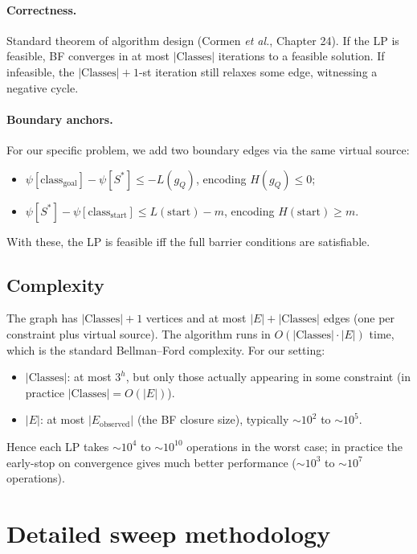 \documentclass[11pt,a4paper]{article}
\theoremstyle{plain}
\theoremstyle{definition}
\begin{document}
\paragraph{Correctness.}
Standard theorem of algorithm design (Cormen \emph{et al.}, Chapter
24). If the LP is feasible, BF converges in at most
$|\mathrm{Classes}|$ iterations to a feasible solution. If
infeasible, the
$|\mathrm{Classes}| + 1$-st iteration still relaxes some edge,
witnessing a negative cycle.

\paragraph{Boundary anchors.}
For our specific problem, we add two boundary edges via the same
virtual source:
\begin{itemize}
   \item $\psi[\text{class}_{\text{goal}}] - \psi[S^{*}] \le - L(g_Q)$,
         encoding $H(g_Q) \le 0$;
   \item $\psi[S^{*}] - \psi[\text{class}_{\text{start}}] \le L(\text{start}) - m$,
         encoding $H(\text{start}) \ge m$.
\end{itemize}
With these, the LP is feasible iff the full barrier conditions are
satisfiable.

\subsection*{Complexity}

The graph has $|\mathrm{Classes}| + 1$ vertices and at most
$|E| + |\mathrm{Classes}|$ edges (one per constraint plus virtual
source). The algorithm runs in
$O(|\mathrm{Classes}| \cdot |E|)$ time, which is the standard
Bellman--Ford complexity. For our setting:
\begin{itemize}
   \item $|\mathrm{Classes}|$: at most $3^h$, but only those
         actually appearing in some constraint
         (in practice $|\mathrm{Classes}| = O(|E|)$).
   \item $|E|$: at most $|E_{\mathrm{observed}}|$
         (the BF closure size), typically $\sim 10^2$ to $\sim 10^5$.
\end{itemize}
Hence each LP takes $\sim 10^4$ to $\sim 10^{10}$ operations in
the worst case; in practice the early-stop on convergence gives
much better performance ($\sim 10^3$ to $\sim 10^7$ operations).

\section{Detailed sweep methodology}\label{app:sweep}
\end{document}
